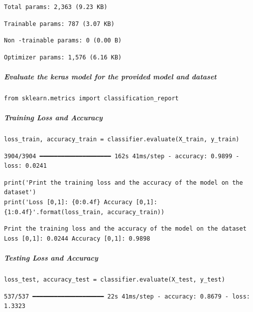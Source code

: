 \begin{verbatim}
Total params: 2,363 (9.23 KB)
\end{verbatim}

\begin{verbatim}
Trainable params: 787 (3.07 KB)
\end{verbatim}

\begin{verbatim}
Non -trainable params: 0 (0.00 B)
\end{verbatim}

\begin{verbatim}
Optimizer params: 1,576 (6.16 KB)
\end{verbatim}

\subparagraph{Evaluate the keras model for the provided model and dataset}

\begin{verbatim}
from sklearn.metrics import classification_report
\end{verbatim}

\subparagraph{Training Loss and Accuracy}

\begin{verbatim}
loss_train, accuracy_train = classifier.evaluate(X_train, y_train)
\end{verbatim}

\begin{verbatim}
3904/3904 ━━━━━━━━━━━━━━━━━━━━ 162s 41ms/step - accuracy: 0.9899 - loss: 0.0241
\end{verbatim}

\begin{verbatim}
print('Print the training loss and the accuracy of the model on the dataset')
print('Loss [0,1]: {0:0.4f} Accuracy [0,1]: {1:0.4f}'.format(loss_train, accuracy_train))
\end{verbatim}

\begin{verbatim}
Print the training loss and the accuracy of the model on the dataset
Loss [0,1]: 0.0244 Accuracy [0,1]: 0.9898
\end{verbatim}

\subparagraph{Testing Loss and Accuracy}

\begin{verbatim}
loss_test, accuracy_test = classifier.evaluate(X_test, y_test)
\end{verbatim}

\begin{verbatim}
537/537 ━━━━━━━━━━━━━━━━━━━━ 22s 41ms/step - accuracy: 0.8679 - loss: 1.3323
\end{verbatim}

